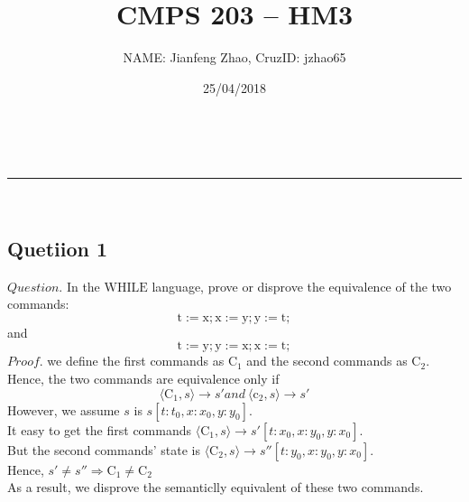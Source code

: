 \documentclass[a4paper,11pt,fleqn]{article}
\makeatletter
\newcommand{\linia}{\rule{\linewidth}{0.5pt}}
\theoremstyle{mytheor}
\renewcommand{\maketitle}{
\begin{center}
\vspace{2ex}
{\huge \textsc{\@title}}
\vspace{1ex}
\\
\linia\\
\@author \hfill \@date
\vspace{4ex}
\end{center}
}
\makeatother
\begin{document}
\title{CMPS 203 -- HM3}

\author{NAME: Jianfeng Zhao, CruzID: jzhao65}

\date{25/04/2018}

\maketitle




\subsection*{Quetiion 1}
$Question.$ In the $\mathrm{WHILE}$ language, prove or disprove the equivalence of the two commands:\\
$$\mathrm{t} := \mathrm{x};\mathrm{x} := \mathrm{y};\mathrm{y} := \mathrm{t};$$
and\\
$$\mathrm{t} := \mathrm{y};\mathrm{y} := \mathrm{x};\mathrm{x} := \mathrm{t};$$
$Proof.$ we define the first commands as $\mathrm{C}_1$ and the second commands as $\mathrm{C}_2$. Hence, the two commands are equivalence only if \\
$$\langle \mathrm{C}_1, s \rangle \to s' and\  \langle \mathrm{c}_2, s \rangle \to s'$$
However, we assume $s$ is $s[t: t_0, x: x_0, y: y_0]$.\\
It easy to get the first commands $\langle \mathrm{C}_1, s \rangle  \to s'[t:x_0, x: y_0, y: x_0]$.\\
But the second commands' state is $\langle \mathrm{C}_2, s \rangle  \to s''[t:y_0, x: y_0, y: x_0]$.\\
Hence, $s' \ne s'' \Rightarrow \mathrm{C_1} \ne \mathrm{C_2}$\\
As a result, we disprove the semanticlly equivalent of these two commands. \\
\end{document}
